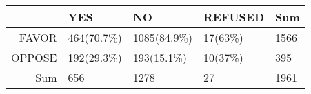 \begin{table}[ht]
\centering
\begin{tabular}{rllll}
  \hline
 & YES & NO & REFUSED & Sum \\ 
  \hline
FAVOR & 464(70.7\%) & 1085(84.9\%) & 17(63\%) & 1566 \\ 
  OPPOSE & 192(29.3\%) & 193(15.1\%) & 10(37\%) & 395 \\ 
  Sum & 656 & 1278 & 27 & 1961 \\ 
   \hline
\end{tabular}
\end{table}
